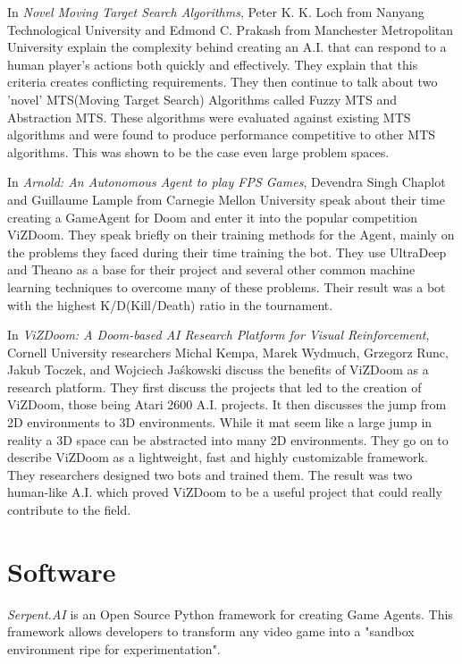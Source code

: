 In {\it Novel Moving Target Search Algorithms}, Peter K. K. Loch from Nanyang Technological University and Edmond C. Prakash from Manchester Metropolitan University explain the complexity behind creating an A.I. that can respond to a human player's actions both quickly and effectively. They explain that this criteria creates conflicting requirements. They then continue to talk about two 'novel' MTS(Moving Target Search) Algorithms called Fuzzy MTS and Abstraction MTS. These algorithms were evaluated against existing MTS algorithms and were found to produce performance competitive to other MTS algorithms. This was shown to be the case even large problem spaces.

In {\it Arnold: An Autonomous Agent to play FPS Games}, Devendra Singh Chaplot and Guillaume Lample from Carnegie Mellon University speak about their time creating a GameAgent for Doom and enter it into the popular competition ViZDoom. They speak briefly on their training methods for the Agent, mainly on the problems they faced during their time training the bot. They use UltraDeep and Theano as a base for their project and several other common machine learning techniques to overcome many of these problems. Their result was a bot with the highest K/D(Kill/Death) ratio in the tournament.

In {\it ViZDoom: A Doom-based AI Research Platform for Visual Reinforcement}, Cornell University researchers Michal Kempa, Marek Wydmuch, Grzegorz Runc, Jakub Toczek, and Wojciech Jaśkowski discuss the benefits of ViZDoom as a research platform. They first discuss the projects that led to the creation of ViZDoom, those being Atari 2600 A.I. projects. It then discusses the jump from 2D environments to 3D environments. While it mat seem like a large jump in reality a 3D space can be abstracted into many 2D environments. They go on to describe ViZDoom as a lightweight, fast and highly customizable framework. They researchers designed two bots and trained them. The result was two human-like A.I. which proved ViZDoom to be a useful project that could really contribute to the field.


\section{Software}
{\it Serpent.AI} is an Open Source Python framework for creating Game Agents. This framework allows developers to transform any video game into a "sandbox environment ripe for experimentation".

